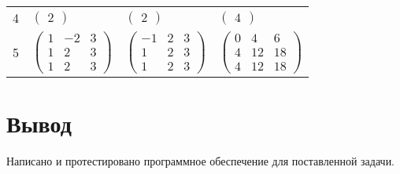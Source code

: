 \begin{table}
\begin{center}
\begin{tabular}{l|l|l|l}
			\vspace{2mm}
			\vspace{2mm}
			4 & $\begin{pmatrix}
				2
			\end{pmatrix}$ &
			$\begin{pmatrix}
				2
			\end{pmatrix}$ &
			$\begin{pmatrix}
				4
			\end{pmatrix}$ \\
			\vspace{2mm}
			\vspace{2mm}
			5 & $\begin{pmatrix}
				1 & -2 & 3\\
				1 & 2 & 3\\
				1 & 2 & 3
			\end{pmatrix}$ &
			$\begin{pmatrix}
				-1 & 2 & 3\\
				1 & 2 & 3\\
				1 & 2 & 3
			\end{pmatrix}$ &
			$\begin{pmatrix}
				0 & 4 & 6\\
				4 & 12 & 18\\
				4 & 12 & 18
			\end{pmatrix}$
		\end{tabular}
	\label{tbl:functional_test}
	\end{center}
\end{table}

\FloatBarrier


\section*{Вывод}

Написано и протестировано программное обеспечение для поставленной задачи.
